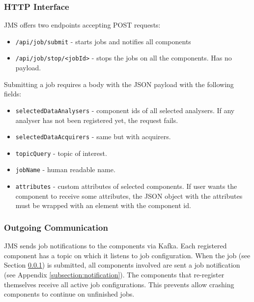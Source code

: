 \subsubsection{HTTP Interface}\label{subsubsection:jms_httpinterface}

JMS offers two endpoints accepting POST requests:

\begin{itemize}
    \item \texttt{/api/job/submit} - starts jobs and notifies all components
    \item \texttt{/api/job/stop/<jobId>} - stops the jobs on all the components. Has no payload.
\end{itemize}

Submitting a job requires a body with the JSON payload with the following fields:

\begin{itemize}
    \item \texttt{selectedDataAnalysers} - component ids of all selected analysers. If any analyser has not been registered yet, the request fails.
    \item \texttt{selectedDataAcquirers} - same but with acquirers.
    \item \texttt{topicQuery} - topic of interest.
    \item \texttt{jobName} - human readable name.
    \item \texttt{attributes} - custom attributes of selected components. If user wants the component to receive some attributes, the JSON object with the attributes must be wrapped with an element with the component id. 
\end{itemize}

\subsubsection{Outgoing Communication}

JMS sends job notifications to the components via Kafka. Each registered component has a topic on which it listens to job configuration. When the job (see Section \ref{subsubsection:jms_httpinterface}) is submitted, all components involved are sent a job notification (see Appendix \ref{subsection:notification}). The components that re-register themselves receive all active job configurations. This prevents allow crashing components to continue on unfinished jobs.
